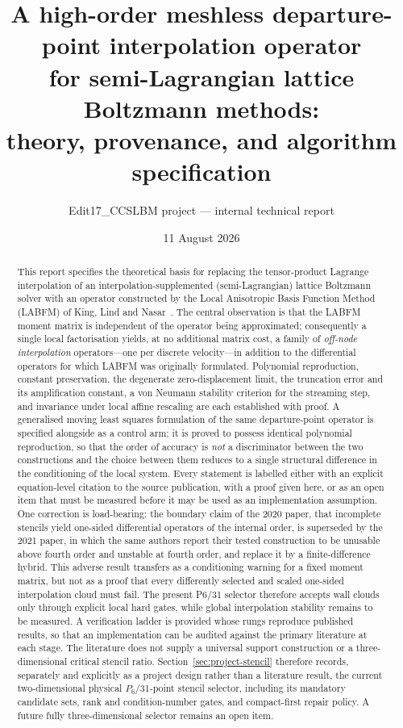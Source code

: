 \documentclass[11pt,a4paper]{article}
\title{\bfseries A high-order meshless departure-point interpolation operator\\
for semi-Lagrangian lattice Boltzmann methods:\\[0.25em]
\large theory, provenance, and algorithm specification}
\author{Edit17\_CCSLBM project --- internal technical report}
\date{11 August 2026}
\begin{document}
\maketitle

\begin{abstract}
\noindent
This report specifies the theoretical basis for replacing the tensor-product
Lagrange interpolation of an interpolation-supplemented (semi-Lagrangian) lattice
Boltzmann solver with an operator constructed by the Local Anisotropic Basis
Function Method (LABFM) of King, Lind and Nasar~\cite{KLN2020,KL2021}. The central
observation is that the LABFM moment matrix is independent of the operator being
approximated; consequently a single local factorisation yields, at no additional
matrix cost, a family of \emph{off-node interpolation} operators---one per discrete
velocity---in addition to the differential operators for which LABFM was originally
formulated. Polynomial reproduction, constant preservation, the degenerate
zero-displacement limit, the truncation error and its amplification constant, a von
Neumann stability criterion for the streaming step, and invariance under local affine
rescaling are each established with proof. A generalised moving least squares
formulation of the same departure-point operator is specified alongside as a control
arm; it is proved to possess identical polynomial reproduction, so that the order of
accuracy is \emph{not} a discriminator between the two constructions and the choice
between them reduces to a single structural difference in the conditioning of the
local system. Every statement is labelled either with an
explicit equation-level citation to the source publication, with a proof given here,
or as an open item that must be measured before it may be used as an implementation
assumption. One correction is load-bearing: the boundary claim of the 2020 paper, that
incomplete stencils yield one-sided differential operators of the internal order, is
superseded by the 2021 paper, in which the same authors report their tested construction
to be unusable above fourth order and unstable at fourth order, and replace it by a
finite-difference hybrid. This adverse result transfers as a conditioning warning for a
fixed moment matrix, but not as a proof that every differently selected and scaled
one-sided interpolation cloud must fail. The present P6/31 selector therefore accepts
wall clouds only through explicit local hard gates, while global interpolation stability
remains to be measured. A verification ladder is provided whose rungs reproduce
published results, so that an implementation
can be audited against the primary literature at each stage. The literature does not
supply a universal support construction or a three-dimensional critical stencil ratio.
Section~\ref{sec:project-stencil} therefore records, separately and explicitly as a
project design rather than a literature result, the current two-dimensional physical
$P_6$/31-point stencil selector, including its mandatory candidate sets, rank and
condition-number gates, and compact-first repair policy. A future fully three-dimensional
selector remains an open item.
\end{abstract}
\end{document}
